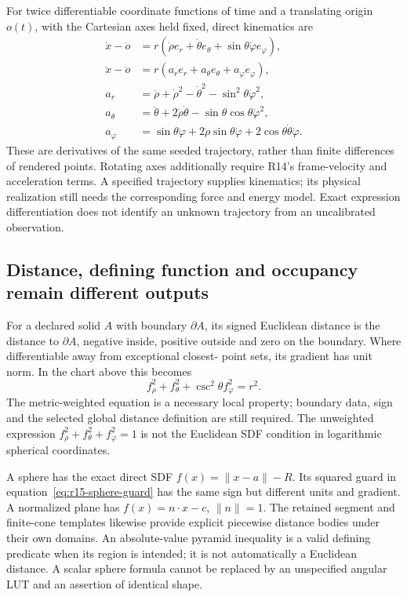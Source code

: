 For twice differentiable coordinate functions of time and a translating
origin $o(t)$, with the Cartesian axes held fixed, direct kinematics are
\begin{align}
 \dot x-\dot o&=r(\dot\rho e_r+\dot\theta e_\theta+
                                \sin\theta\dot\varphi e_\varphi),\nonumber\\
 \ddot x-\ddot o&=r(a_r e_r+a_\theta e_\theta+a_\varphi e_\varphi),\nonumber\\
 a_r&=\ddot\rho+\dot\rho^2-\dot\theta^2-\sin^2\theta\dot\varphi^2,\nonumber\\
 a_\theta&=\ddot\theta+2\dot\rho\dot\theta
                          -\sin\theta\cos\theta\dot\varphi^2,\nonumber\\
 a_\varphi&=\sin\theta\ddot\varphi
       +2\dot\rho\sin\theta\dot\varphi+2\cos\theta\dot\theta\dot\varphi.
 \label{eq:r15-spherical-kinematics}
\end{align}
These are derivatives of the same seeded trajectory, rather than finite
differences of rendered points. Rotating axes additionally require R14's
frame-velocity and acceleration terms. A specified trajectory supplies
kinematics; its physical realization still needs the corresponding force and
energy model. Exact expression differentiation does not identify an unknown
trajectory from an uncalibrated observation.

\subsection{Distance, defining function and occupancy remain different outputs}
For a declared solid $A$ with boundary $\partial A$, its signed Euclidean
distance is the distance to $\partial A$, negative inside, positive outside
and zero on the boundary. Where differentiable away from exceptional closest-
point sets, its gradient has unit norm. In the chart above this becomes
\begin{equation}
 f_\rho^2+f_\theta^2+\csc^2\theta f_\varphi^2=r^2.
 \label{eq:r15-sdf-eikonal}
\end{equation}
The metric-weighted equation is a necessary local property; boundary data,
sign and the selected global distance definition are still required. The
unweighted expression $f_\rho^2+f_\theta^2+f_\varphi^2=1$ is not the Euclidean
SDF condition in logarithmic spherical coordinates.

A sphere has the exact direct SDF $f(x)=\|x-a\|-R$. Its squared guard in
equation~\eqref{eq:r15-sphere-guard} has the same sign but different units and
gradient. A normalized plane has $f(x)=n\cdot x-c$, $\|n\|=1$.
The retained segment and finite-cone templates likewise provide explicit
piecewise distance bodies under their own domains. An absolute-value pyramid
inequality is a valid defining predicate when its region is intended; it is
not automatically a Euclidean distance. A scalar sphere formula cannot be
replaced by an unspecified angular LUT and an assertion of identical shape.

